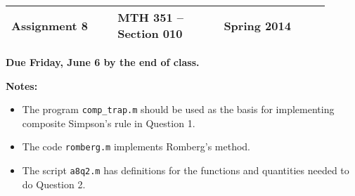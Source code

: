 \documentclass{article}
\newcommand{\myspace}{0.4cm}
\begin{document}
\begin{center}

\large
\begin{tabular}{L{0.3\linewidth} C{0.3\linewidth} R{0.3\linewidth}}
\hline
Assignment 8	&MTH 351 -- Section 010		&Spring 2014 \\
\hline
\end{tabular}

\vspace{\myspace}

{\bf Due Friday, June 6 by the end of class.}
\end{center}

{\bf Notes:} 
\begin{itemize}
\itemsep0em 
\item The program {\tt comp\_trap.m} should be used as the basis for implementing composite Simpson's rule in Question 1.
\item The code {\tt romberg.m} implements Romberg's method.
\item The script {\tt a8q2.m} has definitions for the functions and quantities needed to do Question 2.
\end{itemize}
\end{document}

